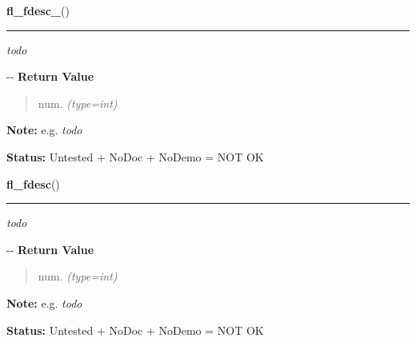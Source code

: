     \label{xformslib:flmisc:fl_fdesc_}

    \vspace{0.5ex}

\hspace{.8\funcindent}\begin{boxedminipage}{\funcwidth}

    \raggedright \textbf{fl\_fdesc\_}()

    \vspace{-1.5ex}

    \rule{\textwidth}{0.5\fboxrule}
\setlength{\parskip}{2ex}

\emph{todo}

-{}-
\setlength{\parskip}{1ex}
      \textbf{Return Value}
    \vspace{-1ex}

      \begin{quote}

num.
      {\it (type=int)}

      \end{quote}

\textbf{Note:} 
e.g. \emph{todo}


\textbf{Status:} 
Untested + NoDoc + NoDemo = NOT OK


    \end{boxedminipage}

    \label{xformslib:flmisc:fl_fdesc_}

    \vspace{0.5ex}

\hspace{.8\funcindent}\begin{boxedminipage}{\funcwidth}

    \raggedright \textbf{fl\_fdesc}()

    \vspace{-1.5ex}

    \rule{\textwidth}{0.5\fboxrule}
\setlength{\parskip}{2ex}

\emph{todo}

-{}-
\setlength{\parskip}{1ex}
      \textbf{Return Value}
    \vspace{-1ex}

      \begin{quote}

num.
      {\it (type=int)}

      \end{quote}

\textbf{Note:} 
e.g. \emph{todo}


\textbf{Status:} 
Untested + NoDoc + NoDemo = NOT OK


    \end{boxedminipage}

